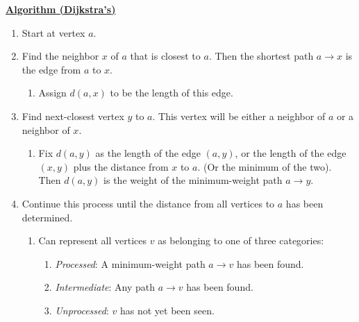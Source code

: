 \documentclass[12pt]{extarticle}
\theoremstyle{definition}
\theoremstyle{remark}
\newcommand{\probtitle}[1]{\noindent \textbf{\ul{#1}}}
\begin{document}
\begin{tcolorbox}[colback=blue!80!red!10!white]
    \noindent\probtitle{Algorithm (Dijkstra’s)}
    \begin{enumerate}
        \item Start at vertex $a$.
        \item Find the neighbor $x$ of $a$ that is closest to $a$. Then the shortest path $a\to x$ is the edge from $a$ to $x$. \begin{enumerate}
            \item Assign $d(a,x)$ to be the length of this edge.
        \end{enumerate}
        \item Find next-closest vertex $y$ to $a$. This vertex will be either a neighbor of $a$ or a neighbor of $x$. \begin{enumerate}
            \item Fix $d(a,y)$ as the length of the edge $(a,y)$, or the length of the edge $(x,y)$ plus the distance from $x$ to $a$. (Or the minimum of the two). Then $d(a,y)$ is the weight of the minimum-weight path $a\to y$.
        \end{enumerate}
        \item Continue this process until the distance from all vertices to $a$ has been determined. \begin{enumerate}
            \item Can represent all vertices $v$ as belonging to one of three categories: \begin{enumerate}
                \item \textit{Processed}: A minimum-weight path $a\to v$ has been found.
                \item \textit{Intermediate}: Any path $a\to v$ has been found.
                \item \textit{Unprocessed}: $v$ has not yet been seen.
            \end{enumerate}
        \end{enumerate}
    \end{enumerate}
\end{tcolorbox}
\end{document}
